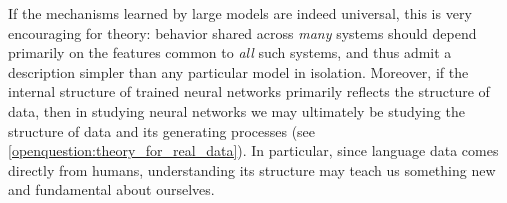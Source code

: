 If the mechanisms learned by large models are indeed universal, this is very encouraging for theory: behavior shared across \emph{many} systems should depend primarily on the features common to \emph{all} such systems, and thus admit a description simpler than any particular model in isolation.
Moreover, if the internal structure of trained neural networks primarily reflects the structure of data, then in studying neural networks we may ultimately be studying the structure of data and its generating processes (see \cref{openquestion:theory_for_real_data}).
In particular, since language data comes directly from humans, understanding its structure may teach us something new and fundamental about ourselves.

